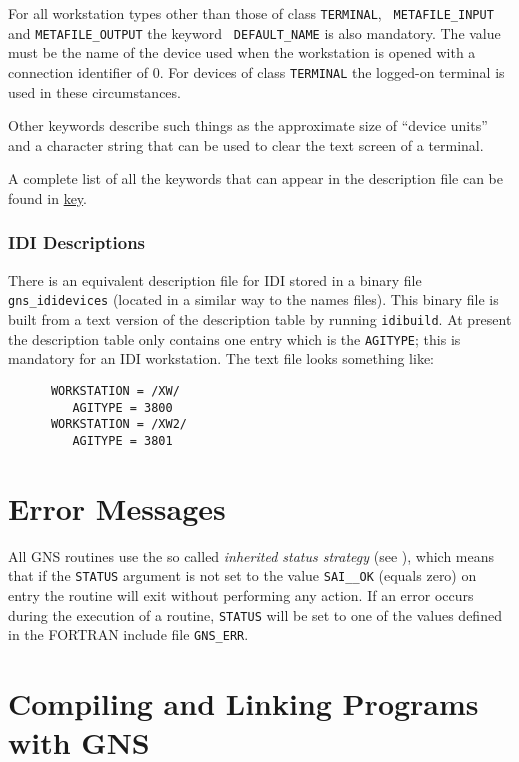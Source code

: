 For all workstation types other than those of class {\tt TERMINAL}, {\tt
METAFILE\_\-INPUT} and {\tt METAFILE\_\-OUTPUT} the keyword {\tt
DEFAULT\_NAME} is also mandatory. The value must be the name of the
device used when the workstation is opened with a connection identifier of
0. For devices of class {\tt TERMINAL} the logged-on terminal is used in
these circumstances. 

Other keywords describe such things as the
approximate size of ``device units'' and a character string that can be
used to clear the text screen of a terminal.

A complete list of all the keywords that can appear in the description file
can be found in \hyperref{this appendix}{appendix~}{}{key}.

\subsubsection{IDI Descriptions}

There is an equivalent description file for IDI stored in a binary file
{\tt gns\_ididevices} (located in a similar way to the names files).
This binary file is built from a text version of the description table by
running {\tt idibuild}. At present the description table only
contains one entry which is the {\tt AGITYPE}; this is mandatory for an IDI
workstation. The text file looks something like:

\begin{verbatim}
      WORKSTATION = /XW/
         AGITYPE = 3800
      WORKSTATION = /XW2/
         AGITYPE = 3801
\end{verbatim}

\section{Error Messages}\label{er}

All GNS routines use the so called {\em inherited status strategy}
(see ), which means
that if the {\tt STATUS} argument is not set to the value {\tt SAI\_\_OK}
(equals zero) on entry the routine will exit without performing any action. If
an error occurs during the execution of a routine, {\tt STATUS} will be set to
one of the values defined in the FORTRAN include file {\tt GNS\_ERR}.

\section{Compiling and Linking Programs with GNS}\label{cl}

